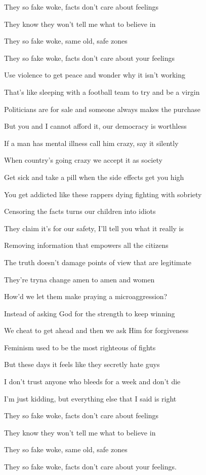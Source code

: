 \begin{refsection}
\begin{tcolorbox}[quote]
They so fake woke, facts don't care about feelings

They know they won't tell me what to believe in

They so fake woke, same old, safe zones

They so fake woke, facts don't care about your feelings

Use violence to get peace and wonder why it isn't working

That's like sleeping with a football team to try and be a virgin

Politicians are for sale and someone always makes the purchase

But you and I cannot afford it, our democracy is worthless

If a man has mental illness call him crazy, say it silently

When country's going crazy we accept it as society

Get sick and take a pill when the side effects get you high

You get addicted like these rappers dying fighting with sobriety

Censoring the facts turns our children into idiots

They claim it's for our safety, I'll tell you what it really is

Removing information that empowers all the citizens

The truth doesn't damage points of view that are legitimate

They're tryna change amen to amen and women

How'd we let them make praying a microaggression?

Instead of asking God for the strength to keep winning

We cheat to get ahead and then we ask Him for forgiveness

Feminism used to be the most righteous of fights

But these days it feels like they secretly hate guys

I don't trust anyone who bleeds for a week and don't die

I'm just kidding, but everything else that I said is right

They so fake woke, facts don't care about feelings

They know they won't tell me what to believe in

They so fake woke, same old, safe zones

They so fake woke, facts don't care about your feelings.\textsuperscript{\cite{url982g3b329}}

\end{tcolorbox}

\printbibliography[heading=subbibliography]

\end{refsection}
